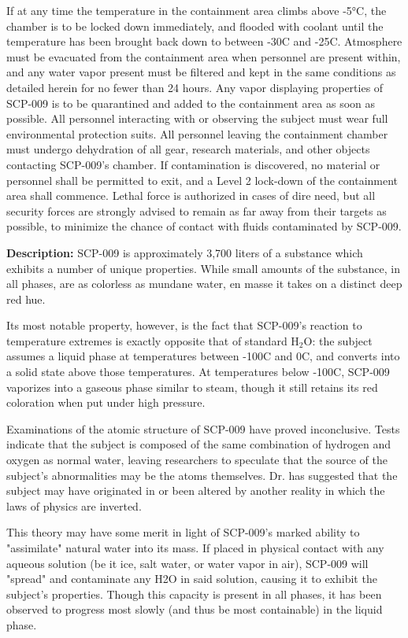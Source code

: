 If at any time the temperature in the containment area climbs above -5°C, the chamber is to be locked down immediately, and flooded with coolant until the temperature has been brought back down to between -30\degree C and -25\degree C. Atmosphere must be evacuated from the containment area when personnel are present within, and any water vapor present must be filtered and kept in the same conditions as detailed herein for no fewer than 24 hours. Any vapor displaying properties of SCP-009 is to be quarantined and added to the containment area as soon as possible.
\newpage
All personnel interacting with or observing the subject must wear full environmental protection suits. All personnel leaving the containment chamber must undergo dehydration of all gear, research materials, and other objects contacting SCP-009's chamber. If contamination is discovered, no material or personnel shall be permitted to exit, and a Level 2 lock-down of the containment area shall commence. Lethal force is authorized in cases of dire need, but all security forces are strongly advised to remain as far away from their targets as possible, to minimize the chance of contact with fluids contaminated by SCP-009.

\textbf{Description:} SCP-009 is approximately 3,700 liters of a substance which exhibits a number of unique properties. While small amounts of the substance, in all phases, are as colorless as mundane water, en masse it takes on a distinct deep red hue.

Its most notable property, however, is the fact that SCP-009's reaction to temperature extremes is exactly opposite that of standard H$_{2}$O: the subject assumes a liquid phase at temperatures between -100\degree C and 0\degree C, and converts into a solid state above those temperatures. At temperatures below -100\degree C, SCP-009 vaporizes into a gaseous phase similar to steam, though it still retains its red coloration when put under high pressure.

Examinations of the atomic structure of SCP-009 have proved inconclusive. Tests indicate that the subject is composed of the same combination of hydrogen and oxygen as normal water, leaving researchers to speculate that the source of the subject's abnormalities may be the atoms themselves. Dr.  has suggested that the subject may have originated in or been altered by another reality in which the laws of physics are inverted.

This theory may have some merit in light of SCP-009's marked ability to "assimilate" natural water into its mass. If placed in physical contact with any aqueous solution (be it ice, salt water, or water vapor in air), SCP-009 will "spread" and contaminate any H2O in said solution, causing it to exhibit the subject's properties. Though this capacity is present in all phases, it has been observed to progress most slowly (and thus be most containable) in the liquid phase.

